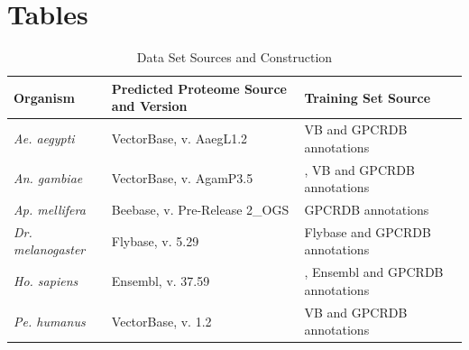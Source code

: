 \section*{Tables}


\begin{table}[H]
  \caption{Data Set Sources and Construction}
  \small
  \begin{tabular}{| l | l | l |}
    \hline
    \textbf{Organism} & \textbf{Predicted Proteome Source and Version} & \textbf{Training Set Source} \\ \hline
    \emph{Ae. aegypti} & VectorBase, v. AaegL1.2 & VB and GPCRDB annotations \\ \hline
    \emph{An. gambiae} & VectorBase, v. AgamP3.5 & \cite{Hill2002}, VB and GPCRDB annotations \\ \hline
    \emph{Ap. mellifera} & Beebase, v. Pre-Release 2\_OGS & GPCRDB annotations \\ \hline
    \emph{Dr. melanogaster} & Flybase, v. 5.29 & Flybase and GPCRDB annotations \\ \hline
    \emph{Ho. sapiens} & Ensembl, v. 37.59 & \cite{Zhang2006}, Ensembl and GPCRDB annotations \\ \hline
    \emph{Pe. humanus} & VectorBase, v. 1.2 & VB and GPCRDB annotations \\ \hline
  \end{tabular}
  \label{tab:data-sources}
  
\end{table}

